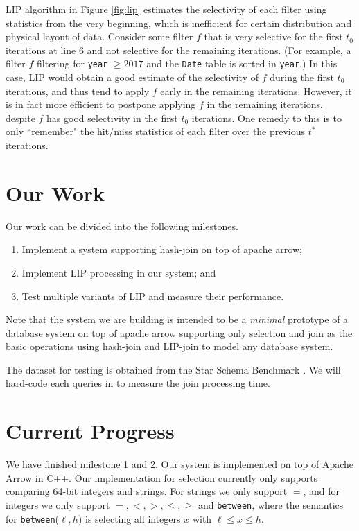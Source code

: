 \documentclass[10pt]{article}
\begin{document}
LIP algorithm in Figure \ref{fig:lip} estimates the selectivity of each filter using statistics from the very beginning, which is inefficient for certain distribution and physical layout of data. Consider some filter $f$ that is very selective for the first $t_0$ iterations at line 6 and not selective for the remaining iterations. (For example, a filter $f$ filtering for \texttt{year} $\geq 2017$ and the \texttt{Date} table is sorted in \texttt{year}.) In this case, LIP would obtain a good estimate of the selectivity of $f$ during the first $t_0$ iterations, and thus tend to apply $f$ early in the remaining iterations. However, it is in fact more efficient to postpone applying $f$ in the remaining iterations, despite $f$ has good selectivity in the first $t_0$ iterations. One remedy to this is to only ``remember" the hit/miss statistics of each filter over the previous $t^*$ iterations.


\section{Our Work}

Our work can be divided into the following milestones.

\begin{enumerate}
	\item Implement a system supporting hash-join on top of apache arrow;
	\item Implement LIP processing in our system; and
	\item Test multiple variants of LIP and measure their performance.
\end{enumerate}


Note that the system we are building is intended to be a \textit{minimal} prototype of a database system on top of apache arrow supporting only selection and join as the basic operations using hash-join and LIP-join to model any database system. 

The dataset for testing is obtained from the Star Schema Benchmark \cite{o2009star}. We will hard-code each queries in \cite{o2009star} to measure the join processing time.

\section{Current Progress}

We have finished milestone 1 and 2. Our system is implemented on top of Apache Arrow in C++. Our implementation for selection currently only supports comparing 64-bit integers and strings. For strings we only support $=$, and for integers we only support $=, <, >, \leq, \geq$ and \texttt{between}, where the semantics for \texttt{between}($\ell, h$) is selecting all integers $x$ with $\ell \leq x \leq h$. 
\end{document}
